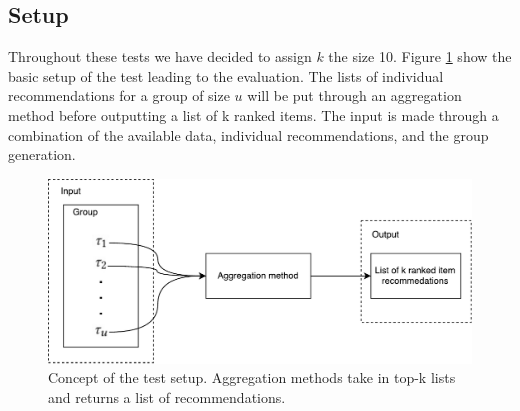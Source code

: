 \subsection{Setup}\label{sec:setup}
Throughout these tests we have decided to assign $k$ the size 10. Figure \ref{fig:setup} show the basic setup of the test leading to the evaluation. The lists of individual recommendations for a group of size $u$ will be put through an aggregation method before outputting a list of k ranked items. The input is made through a combination of the available data, individual recommendations, and the group generation.

\begin{figure}[h]
	\centering
	\includegraphics[scale=.4]{graphics/setup}
	\caption{Concept of the test setup. Aggregation methods take in top-k lists and returns a list of recommendations.}
	\label{fig:setup}
\end{figure}





